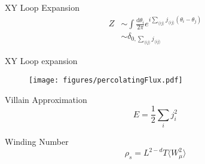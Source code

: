 \documentclass[10pt]{beamer}
\begin{document}
\begin{frame}{XY Loop Expansion}
    \begin{align*}
        Z &\sim \int \frac{\mathrm d \theta_i}{2 \pi} e^{i \sum_{\langle ij \rangle} j_{\langle ij \rangle} (\theta_i - \theta_j)} \\
        & \sim \delta_{0, \sum_{\langle ij \rangle} j_{\langle ij \rangle}}
    \end{align*}
\end{frame}

\begin{frame}{XY Loop expansion}
    \begin{figure}[h!]
        \centering
            \texttt{[image: figures/percolatingFlux.pdf]}
    \end{figure}
\end{frame}

\begin{frame}{Villain Approximation}
    \begin{equation*}
        E = \frac{1}{2} \sum_i j_i^2
    \end{equation*}
\end{frame}


\begin{frame}{Winding Number}
    \begin{equation*}
        \rho_s = L^{2 - d} T \langle W_\mu^2 \rangle 
    \end{equation*}
\end{frame}
\end{document}
